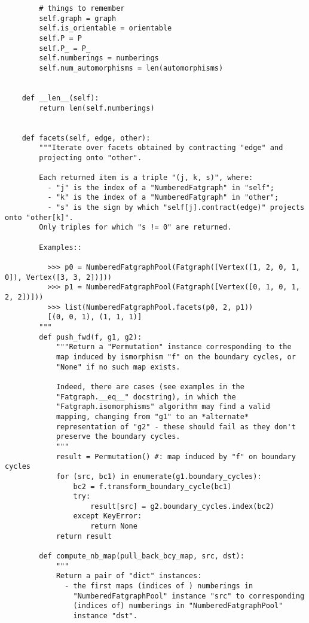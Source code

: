 \begin{lstlisting}
        # things to remember
        self.graph = graph
        self.is_orientable = orientable
        self.P = P
        self.P_ = P_
        self.numberings = numberings
        self.num_automorphisms = len(automorphisms)


    def __len__(self):
        return len(self.numberings)


    def facets(self, edge, other):
        """Iterate over facets obtained by contracting "edge" and
        projecting onto "other".

        Each returned item is a triple "(j, k, s)", where:
          - "j" is the index of a "NumberedFatgraph" in "self";
          - "k" is the index of a "NumberedFatgraph" in "other";
          - "s" is the sign by which "self[j].contract(edge)" projects onto "other[k]".
        Only triples for which "s != 0" are returned.

        Examples::
        
          >>> p0 = NumberedFatgraphPool(Fatgraph([Vertex([1, 2, 0, 1, 0]), Vertex([3, 3, 2])]))
          >>> p1 = NumberedFatgraphPool(Fatgraph([Vertex([0, 1, 0, 1, 2, 2])]))
          >>> list(NumberedFatgraphPool.facets(p0, 2, p1))
          [(0, 0, 1), (1, 1, 1)]
        """
        def push_fwd(f, g1, g2):
            """Return a "Permutation" instance corresponding to the
            map induced by ismorphism "f" on the boundary cycles, or
            "None" if no such map exists.

            Indeed, there are cases (see examples in the
            "Fatgraph.__eq__" docstring), in which the
            "Fatgraph.isomorphisms" algorithm may find a valid
            mapping, changing from "g1" to an *alternate*
            representation of "g2" - these should fail as they don't
            preserve the boundary cycles.
            """
            result = Permutation() #: map induced by "f" on boundary cycles
            for (src, bc1) in enumerate(g1.boundary_cycles):
                bc2 = f.transform_boundary_cycle(bc1)
                try:
                    result[src] = g2.boundary_cycles.index(bc2)
                except KeyError:
                    return None
            return result

        def compute_nb_map(pull_back_bcy_map, src, dst):
            """
            Return a pair of "dict" instances:
              - the first maps (indices of ) numberings in
                "NumberedFatgraphPool" instance "src" to corresponding
                (indices of) numberings in "NumberedFatgraphPool"
                instance "dst".


\end{lstlisting}
